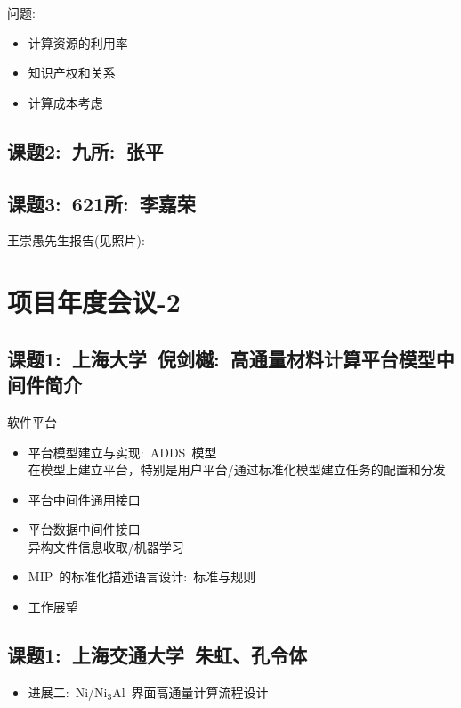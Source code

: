 \documentclass[10pt,a4paper]{article}
\begin{document}
\begin{itemize}
\begin{itemize}
		\end{itemize}
		问题:
		\begin{itemize}
			\item 计算资源的利用率
			\item 知识产权和关系
			\item 计算成本考虑\\

		\end{itemize}
		\subsection{课题2:~九所:~张平}
		\subsection{课题3:~621所:~李嘉荣}
	
王崇愚先生报告(见照片):

\section{项目年度会议-2}
\subsection{课题1:~上海大学~倪剑樾:~高通量材料计算平台模型中间件简介}
软件平台
\begin{itemize}
	\item 平台模型建立与实现:~\textrm{ADDS~}模型\\
在模型上建立平台，特别是用户平台/通过标准化模型建立任务的配置和分发
	\item 平台中间件通用接口
	\item 平台数据中间件接口\\
		异构文件信息收取/机器学习
	\item \textrm{MIP~}的标准化描述语言设计:~标准与规则
	\item 工作展望
\end{itemize}

\subsection{课题1:~上海交通大学~朱虹、孔令体}
\begin{itemize}
	\item 进展二:~\textrm{Ni/Ni$_3$Al~}界面高通量计算流程设计
\end{itemize}

\end{itemize}
\end{document}
